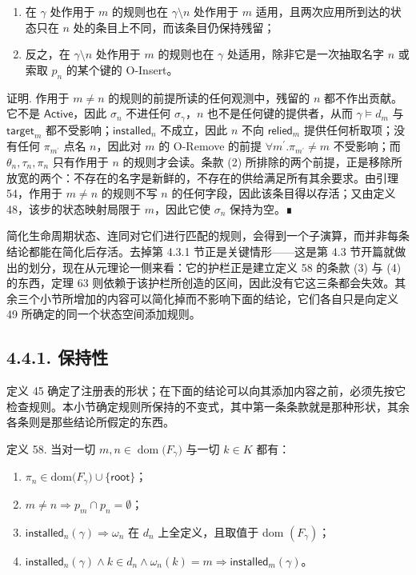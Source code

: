 \begin{enumerate}
\def\labelenumi{\arabic{enumi}.}
\tightlist
\item
  在 $\gamma$ 处作用于 $m$ 的规则也在 $\gamma \setminus n$ 处作用于 $m$ 适用，且两次应用所到达的状态只在 $n$ 处的条目上不同，而该条目仍保持残留；
\item
  反之，在 $\gamma \setminus n$ 处作用于 $m$ 的规则也在 $\gamma$ 处适用，除非它是一次抽取名字 $n$ 或索取 $p _ { n }$ 的某个键的 O-Insert。
\end{enumerate}

证明. 作用于 $m \neq n$ 的规则的前提所读的任何观测中，残留的 $n$ 都不作出贡献。它不是 $\mathsf{Active}$，因此 $\sigma _ { n }$ 不进任何 $\sigma _ { \gamma }$，$n$ 也不是任何键的提供者，从而 $\gamma \models d _ { m }$ 与 $\mathsf{target}_{m}$ 都不受影响；$\mathsf{installed}_{n}$ 不成立，因此 $n$ 不向 $\mathsf{relied}_{m}$ 提供任何析取项；没有任何 $\pi _ { m ^ { \prime } }$ 点名 $n$，因此对 $m$ 的 O-Remove 的前提 $\forall m ^ { \prime } . \pi _ { m ^ { \prime } } \neq m$ 不受影响；而 $\theta _ { n } , \tau _ { n } , \pi _ { n }$ 只有作用于 $n$ 的规则才会读。条款 (2) 所排除的两个前提，正是移除所放宽的两个：不存在的名字是新鲜的，不存在的供给满足所有其余要求。由引理 54，作用于 $m \neq n$ 的规则不写 $n$ 的任何字段，因此该条目得以存活；又由定义 48，该步的状态映射局限于 $m$，因此它使 $\sigma _ { n }$ 保持为空。∎

简化生命周期状态、连同对它们进行匹配的规则，会得到一个子演算，而并非每条结论都能在简化后存活。去掉第 4.3.1 节正是关键情形——这是第 4.3 节开篇就做出的划分，现在从元理论一侧来看：它的护栏正是建立定义 58 的条款 (3) 与 (4) 的东西，定理 63 则依赖于该护栏所创造的区间，因此没有它这三条都会失效。其余三个小节所增加的内容可以简化掉而不影响下面的结论，它们各自只是向定义 49 所确定的同一个状态空间添加规则。

\subsection{4.4.1. 保持性}\label{preservation}

定义 45 确定了注册表的形状；在下面的结论可以向其添加内容之前，必须先按它检查规则。本小节确定规则所保持的不变式，其中第一条条款就是那种形状，其余各条则是那些结论所假定的东西。

定义 58. 当对一切 $m , n \in \mathop { \mathrm { d o m } } \bigl ( F _ { \gamma } \bigr )$ 与一切 $k \in K$ 都有：

\begin{enumerate}
\def\labelenumi{\arabic{enumi}.}
\tightlist
\item
  $\pi _ { n } \in \mathrm { d o m } \bigl ( F _ { \gamma } \bigr ) \cup \{ \mathsf{root} \}$；
\item
  $m \neq n \Rightarrow p _ { m } \cap p _ { n } = \emptyset$；
\item
  $\mathsf{installed}_{n}(\gamma) \Rightarrow \omega _ { n }$ 在 $d _ { n }$ 上全定义，且取值于 dom $\left( F _ { \gamma } \right)$；
\item
  $\mathsf{installed}_{n}(\gamma) \wedge k \in d _ { n } \wedge \omega _ { n } ( k ) = m \Rightarrow \mathsf{installed}_{m}(\gamma)$。
\end{enumerate}

